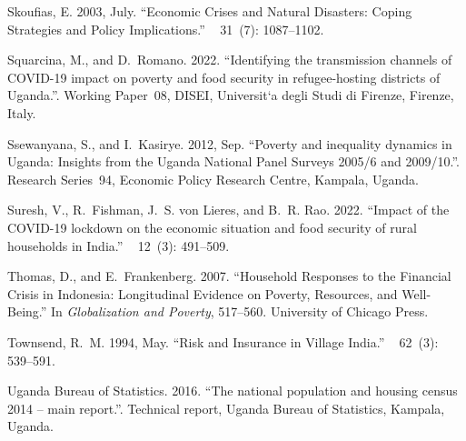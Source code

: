\documentclass{wber}
\begin{document}
\begin{thebibliography}{}
Skoufias, E. 2003, July.
\newblock ``Economic {Crises} and {Natural} {Disasters}: {Coping} {Strategies}
  and {Policy} {Implications}.''
~{ 31\/}~(7):
  1087--1102.

Squarcina, M., and D.~Romano. 2022.
\newblock ``Identifying the transmission channels of {COVID}-19 impact on
  poverty and food security in refugee-hosting districts of {Uganda}.''.
\newblock Working Paper~08, DISEI, Universit`a degli Studi di Firenze, Firenze,
  Italy.

Ssewanyana, S., and I.~Kasirye. 2012, Sep.
\newblock ``Poverty and inequality dynamics in {Uganda}: Insights from the
  {Uganda National Panel Surveys} 2005/6 and 2009/10.''.
\newblock Research Series~94, Economic Policy Research Centre, Kampala, Uganda.

Suresh, V., R.~Fishman, J.~S. von Lieres, and B.~R. Rao. 2022.
\newblock ``Impact of the {COVID-19} lockdown on the economic situation and
  food security of rural households in {India}.''
~{ 12\/}~(3): 491--509.

Thomas, D., and E.~Frankenberg. 2007.
\newblock ``Household {Responses} to the {Financial} {Crisis} in {Indonesia}:
  {Longitudinal} {Evidence} on {Poverty}, {Resources}, and {Well}-{Being}.''
\newblock In {\em Globalization and {Poverty}},  517--560. University of
  Chicago Press.

Townsend, R.~M. 1994, May.
\newblock ``Risk and {Insurance} in {Village} {India}.''
~{ 62\/}~(3): 539--591.

{Uganda Bureau of Statistics}. 2016.
\newblock ``The national population and housing census 2014 -- main report.''.
\newblock Technical report, Uganda Bureau of Statistics, Kampala, Uganda.


\end{thebibliography}
\end{document}
